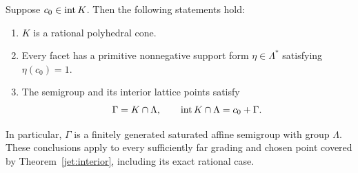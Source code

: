 \begin{theorem}\label{adj:saturation}
Suppose $c_0\in\operatorname{int} K$.  Then the following statements hold:
\begin{enumerate}
 \item $K$ is a rational polyhedral cone.
 \item Every facet has a primitive nonnegative support form
       $\eta\in\Lambda^*$ satisfying $\eta(c_0)=1$.
 \item The semigroup and its interior lattice points satisfy
 \begin{equation}\label{adj:saturation-identities}
   \Gamma=K\cap\Lambda,
   \qquad \operatorname{int} K\cap\Lambda=c_0+\Gamma.
 \end{equation}
\end{enumerate}
In particular, $\Gamma$ is a finitely generated saturated affine
semigroup with group $\Lambda$.  These conclusions apply to every
sufficiently far grading and chosen point covered by
Theorem~\ref{jet:interior}, including its exact rational case.
\end{theorem}

